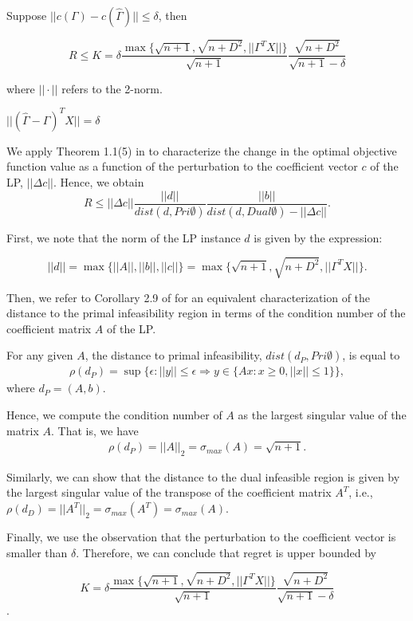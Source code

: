 \documentclass[12pt,a4paper]{article}
\begin{document}
Suppose $||c(\Gamma) - c(\hat{\Gamma})|| \leq \delta$, then

$$ R \leq K = \delta \frac{ \max \{ \sqrt{n+1}, \sqrt{n+D^2}, || \Gamma^T X || \} }{ \sqrt{n+1} } \frac{ \sqrt{n+D^2} }{\sqrt{n+1} - \delta } $$

where $|| \cdot ||$ refers to the 2-norm.

$ || (\hat{\Gamma} - \Gamma)^T X || = \delta $

\bpf

We apply Theorem 1.1(5) in \cite{renegar1993some} to characterize the change in the optimal objective function value as a function of the perturbation to the coefficient vector $c$ of the LP, $|| \Delta c|| $. Hence, we obtain
$$ R \leq  || \Delta c || \frac{ ||d ||  }{ dist(d, Pri\emptyset) } \frac{||b||}{dist(d, Dual\emptyset)- || \Delta c || }. $$

First, we note that the norm of the LP instance $d$ is given by the expression:

$$||d ||  = \max \{ ||A || , ||b || , ||c ||  \} = \max \{ \sqrt{n+1}, \sqrt{n+D^2}, || \Gamma^T X || \} . $$

Then, we refer to Corollary 2.9 of \cite{pena2003characterization} for an equivalent characterization of the distance to the primal infeasibility region in terms of the condition number of the coefficient matrix $A$ of the LP. 

\begin{lem}
For any given $A$, the distance to primal infeasibility, $dist(d_P, Pri\emptyset)$, is equal to
\begin{align*}
\rho(d_P) = \sup \{ \epsilon : ||y|| \leq \epsilon \Rightarrow y \in \{ Ax: x \geq 0, ||x|| \leq 1 \}  \},
\end{align*}
where $d_P = (A, b)$.
\end{lem}

Hence, we compute the condition number of $A$ as the largest singular value of the matrix $A$. That is, we have
\begin{align*}
\rho(d_P) = || A ||_2 = \sigma_{max} (A) = \sqrt{n+1}.
\end{align*}

Similarly, we can show that the distance to the dual infeasible region is given by the largest singular value of the transpose of the coefficient matrix $A^T$, i.e., $\rho(d_D) = || A^T ||_2 =  \sigma_{max} (A^T) = \sigma_{max} (A) $.

Finally, we use the observation that the perturbation to the coefficient vector is smaller than $\delta$. Therefore, we can conclude that regret is upper bounded by

$$ K = \delta \frac{ \max \{ \sqrt{n+1}, \sqrt{n+D^2}, || \Gamma^T X || \} }{ \sqrt{n+1} } \frac{ \sqrt{n+D^2} }{\sqrt{n+1} - \delta } $$.




\end{document}
